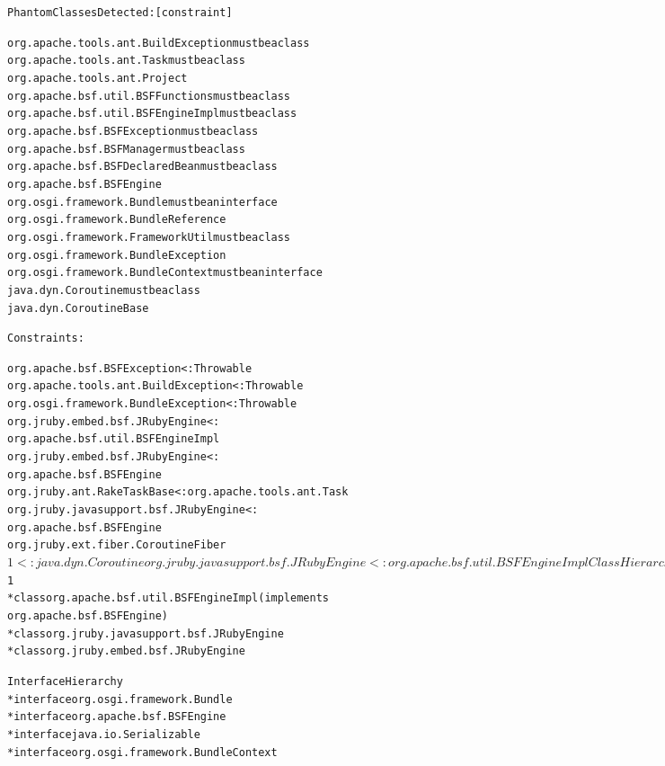 \begin{alltt}\footnotesize
\vspace{2em}
Phantom Classes Detected: \hfill{[constraint]}

org.apache.tools.ant.BuildException \hfill{must be a class}
org.apache.tools.ant.Task \hfill{must be a class}
org.apache.tools.ant.Project
org.apache.bsf.util.BSFFunctions \hfill{must be a class}
org.apache.bsf.util.BSFEngineImpl \hfill{must be a class}
org.apache.bsf.BSFException \hfill{must be a class}
org.apache.bsf.BSFManager \hfill{must be a class}
org.apache.bsf.BSFDeclaredBean \hfill{must be a class}
org.apache.bsf.BSFEngine
org.osgi.framework.Bundle \hfill{must be an interface}
org.osgi.framework.BundleReference
org.osgi.framework.FrameworkUtil \hfill{must be a class}
org.osgi.framework.BundleException
org.osgi.framework.BundleContext \hfill{must be an interface}
java.dyn.Coroutine \hfill{must be a class}
java.dyn.CoroutineBase

Constraints:

org.apache.bsf.BSFException <: Throwable
org.apache.tools.ant.BuildException <: Throwable
org.osgi.framework.BundleException <: Throwable
org.jruby.embed.bsf.JRubyEngine <:
  org.apache.bsf.util.BSFEngineImpl
org.jruby.embed.bsf.JRubyEngine <:
  org.apache.bsf.BSFEngine
org.jruby.ant.RakeTaskBase <: org.apache.tools.ant.Task
org.jruby.javasupport.bsf.JRubyEngine <:
  org.apache.bsf.BSFEngine
org.jruby.ext.fiber.CoroutineFiber$1 <:
  java.dyn.Coroutine
org.jruby.javasupport.bsf.JRubyEngine <:
  org.apache.bsf.util.BSFEngineImpl

Class Hierarchy
* class java.lang.Object
  * class org.apache.bsf.BSFManager
  * class org.osgi.framework.FrameworkUtil
  * class Throwable (implements java.io.Serializable)
    * class org.osgi.framework.BundleException
    * class org.apache.tools.ant.BuildException
    * class org.apache.bsf.BSFException
  * class org.apache.bsf.BSFDeclaredBean
  * class org.apache.bsf.util.BSFFunctions
  * class org.apache.tools.ant.Task
    * class org.jruby.ant.RakeTaskBase
  * class java.dyn.Coroutine
    * class org.jruby.ext.fiber.CoroutineFiber$1
  * class org.apache.bsf.util.BSFEngineImpl (implements
     org.apache.bsf.BSFEngine)
    * class org.jruby.javasupport.bsf.JRubyEngine
    * class org.jruby.embed.bsf.JRubyEngine

Interface Hierarchy
* interface org.osgi.framework.Bundle
* interface org.apache.bsf.BSFEngine
* interface java.io.Serializable
* interface org.osgi.framework.BundleContext
\end{alltt}

